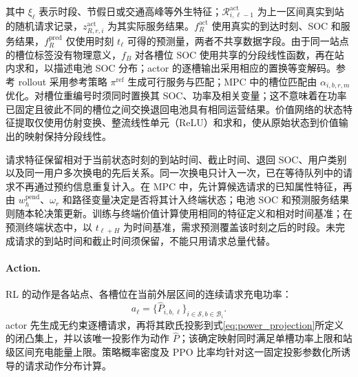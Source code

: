 \documentclass[12pt,a4paper,UTF8]{ctexart}
\begin{document}
其中 $\xi_\ell$ 表示时段、节假日或交通高峰等外生特征；$\mathcal R_{i,\ell-1}^{\mathrm{act}}$ 为上一区间真实到站的随机请求记录，$z_{R,r,i}^{\mathrm{act}}$ 为其实际服务结果。$f_R^{\mathrm{act}}$ 使用真实的到达时刻、SOC 和服务结果，$f_R^{\mathrm{pred}}$ 仅使用时刻 $t_\ell$ 可得的预测量，两者不共享数据字段。由于同一站点的槽位标签没有物理意义，$f_B$ 对各槽位 SOC 使用共享的分段线性函数，再在站内求和，以描述电池 SOC 分布；actor 的逐槽输出采用相应的置换等变解码。参考 rollout 采用参考策略 $\pi^{\mathrm{ref}}$ 生成可行服务与匹配；MPC 中的槽位匹配由 $\alpha_{i,b,r,m}$ 优化。对槽位重编号时须同时置换其 SOC、功率及相关变量；这不意味着在功率已固定且彼此不同的槽位之间交换退回电池具有相同运营结果。价值网络的状态特征提取仅使用仿射变换、整流线性单元（ReLU）和求和，使从原始状态到价值输出的映射保持分段线性。

请求特征保留相对于当前状态时刻的到站时间、截止时间、退回 SOC、用户类别以及同一用户多次换电的先后关系。同一次换电只计入一次，已在等待队列中的请求不再通过预约信息重复计入。在 MPC 中，先计算候选请求的已知属性特征，再由 $w_h^{\mathrm{pend}}$、$\omega_r$ 和路径变量决定是否将其计入终端状态；电池 SOC 和预测服务结果则随本轮决策更新。训练与终端价值计算使用相同的特征定义和相对时间基准；在预测终端状态中，以 $t_{\ell+H}$ 为时间基准，需求预测覆盖该时刻之后的时段。未完成请求的到站时间和截止时间须保留，不能只用请求总量代替。

\paragraph{Action.}
RL 的动作是各站点、各槽位在当前外层区间的连续请求充电功率：
\begin{equation}
a_\ell=
\{\widehat P_{i,b,\ell}\}_{i\in\mathcal S,b\in\mathcal B_i}.
\label{eq:rl_action}
\end{equation}
actor 先生成无约束逐槽请求，再将其欧氏投影到式\eqref{eq:power_projection}所定义的闭凸集上，并以该唯一投影作为动作 $\widehat P$；该确定映射同时满足单槽功率上限和站级区间充电能量上限。策略概率密度及 PPO 比率均针对这一固定投影参数化所诱导的请求动作分布计算。
\end{document}
